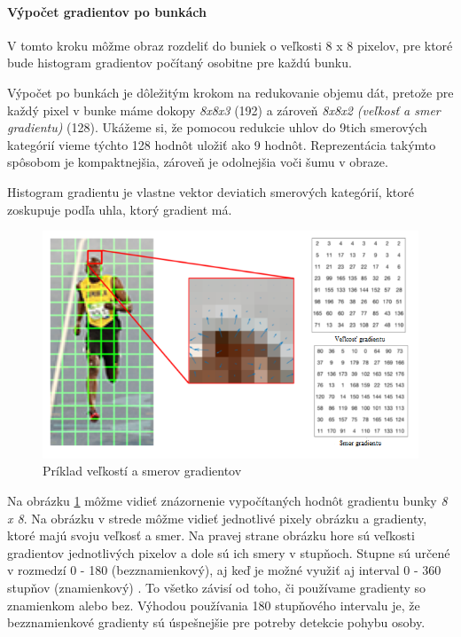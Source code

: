 \paragraph{Výpočet gradientov po bunkách}

V tomto kroku môžme obraz rozdeliť do buniek o veľkosti  8 x 8 pixelov, pre ktoré bude histogram gradientov počítaný osobitne pre každú bunku.

Výpočet po bunkách je dôležitým krokom na redukovanie objemu dát, pretože pre každý pixel v bunke máme dokopy\textit{ 8x8x3 }(192) a zároveň \textit{8x8x2 (veľkosť a smer gradientu)} (128). Ukážeme si, že pomocou redukcie uhlov do 9tich smerových kategórií vieme týchto 128 hodnôt uložiť ako 9 hodnôt. Reprezentácia takýmto spôsobom je kompaktnejšia, zároveň je odolnejšia voči šumu v obraze. 

Histogram gradientu je vlastne vektor deviatich smerových kategórií, ktoré zoskupuje podľa uhla, ktorý gradient má. 

\begin{figure}[H]
  \centering
  \includegraphics[width=16cm]{img/HOGgrad.png}
  \caption{Príklad veľkostí a smerov gradientov \cite{c20}}
  \label{HOGgrad}
\end{figure}
Na obrázku \ref{HOGgrad} môžme vidieť znázornenie vypočítaných hodnôt gradientu bunky \textit{8 x 8}. Na obrázku v strede môžme vidieť jednotlivé pixely obrázku a gradienty, ktoré majú svoju veľkosť a smer. Na pravej strane obrázku hore sú veľkosti gradientov jednotlivých pixelov a dole sú ich smery v stupňoch. Stupne sú určené v rozmedzí 0 - 180 (bezznamienkový), aj keď je možné využiť aj interval 0 - 360 stupňov (znamienkový) . To všetko závisí od toho, či používame gradienty so znamienkom alebo bez. Výhodou používania 180 stupňového intervalu je, že bezznamienkové gradienty sú úspešnejšie pre potreby detekcie pohybu osoby. 

